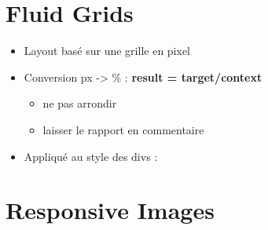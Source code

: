 \hypertarget{fluid-grids}{%
\section{Fluid Grids}\label{fluid-grids}}

\begin{itemize}
\tightlist
\item
  Layout basé sur une grille en pixel
\item
  Conversion px -\textgreater{} \% : \textbf{result = target/context}

  \begin{itemize}
  \tightlist
  \item
    ne pas arrondir
  \item
    laisser le rapport en commentaire
  \end{itemize}
\item
  Appliqué au style des divs :
\end{itemize}

\begin{otherlanguage}{english}

\begin{Shaded}
\begin{Highlighting}[]
\end{Highlighting}
\end{Shaded}

\end{otherlanguage}

\hypertarget{responsive-images}{%
\section{Responsive Images}\label{responsive-images}}


